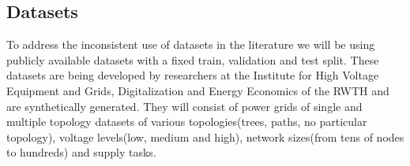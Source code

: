 \subsection*{Datasets}

To address the inconsistent use of datasets in the literature we will be using
publicly available datasets with a fixed train, validation and test split.
These datasets are being developed by researchers at the Institute for High Voltage
Equipment and Grids, Digitalization and Energy Economics of the RWTH and are
synthetically generated.
They will consist of power grids of single and multiple topology datasets of various
topologies(trees, paths, no particular topology), voltage levels(low, medium and high),
network sizes(from tens of nodes to hundreds) and supply tasks.
